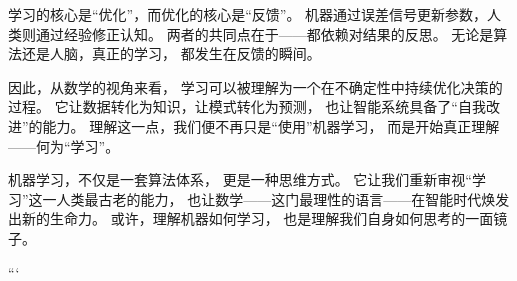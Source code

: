 学习的核心是“优化”，而优化的核心是“反馈”。  
机器通过误差信号更新参数，人类则通过经验修正认知。  
两者的共同点在于——都依赖对结果的反思。  
无论是算法还是人脑，真正的学习，  
都发生在反馈的瞬间。



因此，从数学的视角来看，  
学习可以被理解为一个在不确定性中持续优化决策的过程。  
它让数据转化为知识，让模式转化为预测，  
也让智能系统具备了“自我改进”的能力。  
理解这一点，我们便不再只是“使用”机器学习，  
而是开始真正理解——何为“学习”。



机器学习，不仅是一套算法体系，  
更是一种思维方式。  
它让我们重新审视“学习”这一人类最古老的能力，  
也让数学——这门最理性的语言——在智能时代焕发出新的生命力。  
或许，理解机器如何学习，  
也是理解我们自身如何思考的一面镜子。

\nocite{*}
\newpage
```
